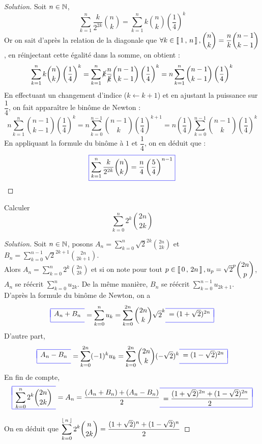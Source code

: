 \documentclass{classe}
\newcommand{\lboxed}[1]{{\color{blue}\begin{array}{|l}\hline\\[-2.4ex]{\color{black}#1}\\[1.2ex]\hline\end{array}}}
\newcommand{\rboxed}[1]{{\color{blue}\begin{array}{r|}\hline\\[-2.4ex]{\color{black}#1}\\[1.2ex]\hline\end{array}}}
\newcommand{\lrboxed}[1]{{\color{blue}\boxed{\color{black}#1}}}
\newenvironment{solution}
  {\renewcommand\qedsymbol{$\blacksquare$}\begin{proof}[Solution]}
  {\end{proof}}
\begin{document}
\begin{solution}
Soit $n \in \mathbb{N}$,
\[
\displaystyle\sum\limits_{k=1}^{n} \dfrac{k}{2^{2k}}\binom{n}{k} = \displaystyle\sum\limits_{k=1}^{n}k \binom{n}{k} \left(\dfrac{1}{4}\right)^k
\]
Or on sait d'après la relation de la diagonale que $\forall k \in \left\llbracket \, 1 \, , \, n \, \right\rrbracket, \displaystyle\binom{n}{k} = \dfrac{n}{k}\binom{n-1}{k-1}$, en réinjectant cette égalité dans la somme, on obtient :
\[
\displaystyle\sum\limits_{k=1}^{n}k \binom{n}{k} \left(\dfrac{1}{4}\right)^k
=\displaystyle\sum\limits_{k=1}^{n}\cancel{k} \dfrac{n}{\cancel{k}}\binom{n-1}{k-1} \left(\dfrac{1}{4}\right)^k
=n\displaystyle\sum\limits_{k=1}^{n} \binom{n-1}{k-1} \left(\dfrac{1}{4}\right)^k
\]
En effectuant un changement d'indice ($k \leftarrow k+1$) et en ajustant la puissance sur $\dfrac{1}{4}$, on fait apparaître le binôme de Newton :
\[
n\displaystyle\sum\limits_{k=1}^{n} \binom{n-1}{k-1} \left(\dfrac{1}{4}\right)^k 
= n\displaystyle\sum\limits_{k=0}^{n-1} \binom{n-1}{k} \left(\dfrac{1}{4}\right)^{k+1} =  n\left(\dfrac{1}{4}\right)\displaystyle\sum\limits_{k=0}^{n-1} \binom{n-1}{k} \left(\dfrac{1}{4}\right)^{k}
\]
En appliquant la formule du binôme à $1$ et $\dfrac{1}{4}$, on en déduit que :
\[
\lrboxed{\displaystyle\sum\limits_{k=1}^{n} \dfrac{k}{2^{2k}}\binom{n}{k} =\dfrac{n}{4}\left(\dfrac{5}{4}\right)^{n-1}}
\]
\end{solution}

\begin{exercice}
Calculer 
\[
\displaystyle\sum\limits_{k=0}^{n} 2^k \binom{2n}{2k}
\]
\end{exercice}

\begin{solution}
Soit $n \in \mathbb{N}$, posons $A_n = \displaystyle\sum\limits_{k=0}^{n} \sqrt{2}^{2k} \binom{2n}{2k}$ et $B_n = \displaystyle\sum\limits_{k=0}^{n-1} \sqrt{2}^{2k+1}  \binom{2n}{2k+1}$.\\
Alors $A_n = \displaystyle\sum\limits_{k=0}^{n} 2^k \binom{2n}{2k}$ et si on note pour tout $ p \in \left\llbracket \, 0 \, , \, 2n \, \right\rrbracket, u_p = \sqrt{2}^{p} \displaystyle\binom{2n}{p}$, $A_n$ se réécrit $\displaystyle\sum\limits_{k=0}^{n} u_{2k}$. De la même manière, $B_n$ se réécrit $\displaystyle\sum\limits_{k=0}^{n-1} u_{2k+1}$.\\
D'après la formule du binôme de Newton, on a
\[
\lboxed{A_n + B_n} 
= \displaystyle\sum\limits_{k=0}^{n} u_{k} 
= \displaystyle\sum\limits_{k=0}^{2n}\binom{2n}{k} \sqrt{2}^k 
\rboxed{= (1+\sqrt{2})^{2n}} 
\]
D'autre part,  
\[
\lboxed{A_n - B_n}
= \displaystyle\sum\limits_{k=0}^{2n} (-1)^k u_{k} 
= \displaystyle\sum\limits_{k=0}^{2n} \binom{2n}{k}  (-\sqrt{2})^k 
\rboxed{= (1-\sqrt{2})^{2n}}
\]
En fin de compte,  
\[
\lboxed{\displaystyle\sum\limits_{k=0}^{n} 2^k \binom{2n}{2k}}
= A_n 
= \dfrac{(A_n+B_n) + (A_n - B_n)}{2} 
\rboxed{= \dfrac{(1+\sqrt{2})^{2n}+(1-\sqrt{2})^{2n}}{2}}
\]

On en déduit que \hfil$\displaystyle\sum\limits_{k=0}^{\left\lfloor \, n \, \right\rfloor} 2^k \binom{n}{2k} = \dfrac{(1+\sqrt{2})^{n}+(1-\sqrt{2})^{n}}{2}$
\end{solution}
\end{document}
